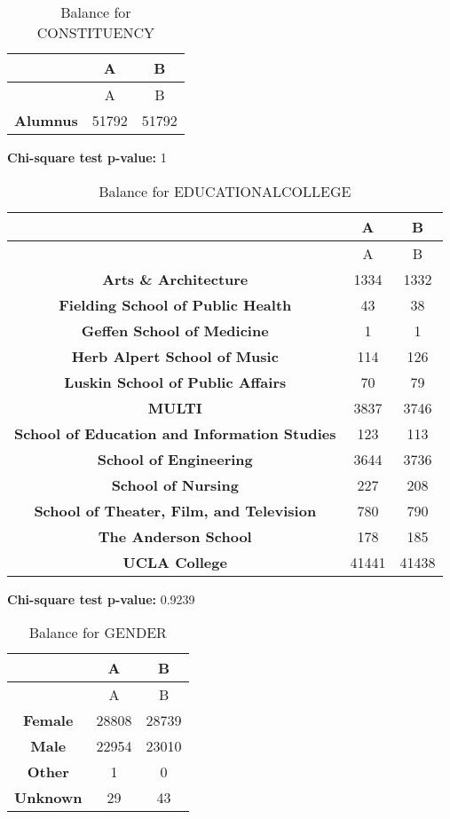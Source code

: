 \documentclass[
]{article}
\begin{document}
\begin{longtable}[]{@{}ccc@{}}
\caption{Balance for CONSTITUENCY}\tabularnewline
\toprule\noalign{}
~ & A & B \\
\midrule\noalign{}
\endfirsthead
\toprule\noalign{}
~ & A & B \\
\midrule\noalign{}
\endhead
\bottomrule\noalign{}
\endlastfoot
\textbf{Alumnus} & 51792 & 51792 \\
\end{longtable}

\textbf{Chi-square test p-value:} 1\\
\pagebreak

\begin{longtable}[]{@{}ccc@{}}
\caption{Balance for EDUCATIONALCOLLEGE}\tabularnewline
\toprule\noalign{}
~ & A & B \\
\midrule\noalign{}
\endfirsthead
\toprule\noalign{}
~ & A & B \\
\midrule\noalign{}
\endhead
\bottomrule\noalign{}
\endlastfoot
\textbf{Arts \& Architecture} & 1334 & 1332 \\
\textbf{Fielding School of Public Health} & 43 & 38 \\
\textbf{Geffen School of Medicine} & 1 & 1 \\
\textbf{Herb Alpert School of Music} & 114 & 126 \\
\textbf{Luskin School of Public Affairs} & 70 & 79 \\
\textbf{MULTI} & 3837 & 3746 \\
\textbf{School of Education and Information Studies} & 123 & 113 \\
\textbf{School of Engineering} & 3644 & 3736 \\
\textbf{School of Nursing} & 227 & 208 \\
\textbf{School of Theater, Film, and Television} & 780 & 790 \\
\textbf{The Anderson School} & 178 & 185 \\
\textbf{UCLA College} & 41441 & 41438 \\
\end{longtable}

\textbf{Chi-square test p-value:} 0.9239\\
\pagebreak

\begin{longtable}[]{@{}ccc@{}}
\caption{Balance for GENDER}\tabularnewline
\toprule\noalign{}
~ & A & B \\
\midrule\noalign{}
\endfirsthead
\toprule\noalign{}
~ & A & B \\
\midrule\noalign{}
\endhead
\bottomrule\noalign{}
\endlastfoot
\textbf{Female} & 28808 & 28739 \\
\textbf{Male} & 22954 & 23010 \\
\textbf{Other} & 1 & 0 \\
\textbf{Unknown} & 29 & 43 \\
\end{longtable}
\end{document}

